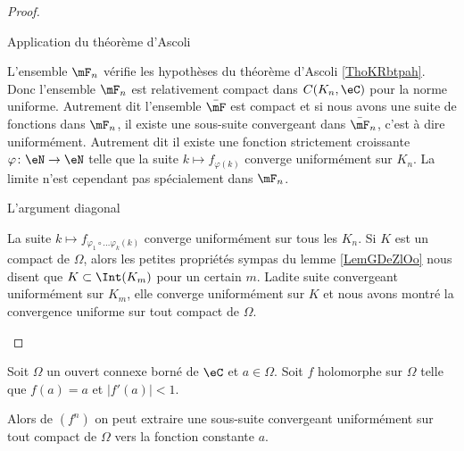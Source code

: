 \begin{proof}
\begin{subproof}
    \item[Application du théorème d'Ascoli]

        L'ensemble \( \mF_n\) vérifie les hypothèses du théorème d'Ascoli \ref{ThoKRbtpah}. Donc l'ensemble \( \mF_n\) est relativement compact dans \( C(K_n,\eC)\) pour la norme uniforme. Autrement dit l'ensemble \( \bar\mF\) est compact et si nous avons une suite de fonctions dans \( \mF_n\), il existe une sous-suite convergeant dans \( \bar\mF_n\), c'est à dire uniformément. Autrement dit il existe une fonction strictement croissante \( \varphi\colon \eN\to \eN\) telle que la suite \( k\mapsto f_{\varphi(k)}\) converge uniformément sur \( K_n\). La limite n'est cependant pas spécialement dans \( \mF_n\).

    \item[L'argument diagonal]

        La suite \( k\mapsto f_{\varphi_1\circ\ldots\varphi_k(k)}\) converge uniformément sur tous les \( K_n\). Si \( K\) est un compact de \( \Omega\), alors les petites propriétés sympas du lemme \ref{LemGDeZlOo} nous disent que \( K\subset \Int(K_m)\) pour un certain \( m\). Ladite suite convergeant uniformément sur \( K_m\), elle converge uniformément sur \( K\) et nous avons montré la convergence uniforme sur tout compact de \( \Omega\).

    \end{subproof}
\end{proof}

\begin{corollary}
    Soit \( \Omega\) un ouvert connexe borné de \( \eC\) et \( a\in \Omega\). Soit \( f\) holomorphe sur \( \Omega\) telle que \( f(a)=a\) et \( | f'(a) |<1\).

    Alors de \( (f^n)\) on peut extraire une sous-suite convergeant uniformément sur tout compact de \( \Omega\) vers la fonction constante \( a\).
\end{corollary}

